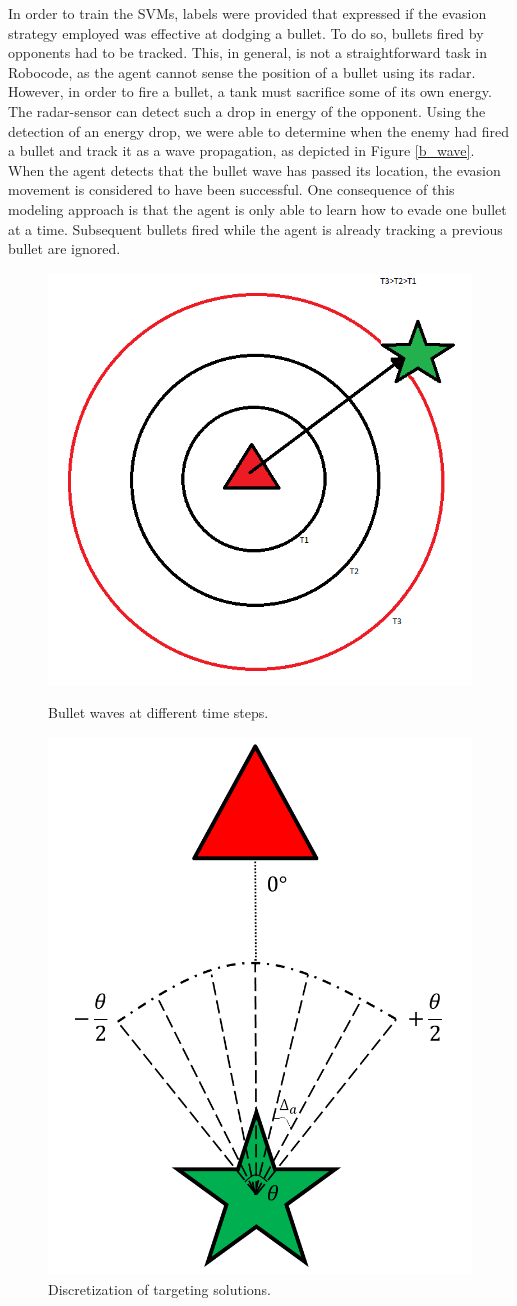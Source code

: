 \documentclass{article}
\theoremstyle{plain}
\theoremstyle{definition}
\theoremstyle{remark}
\begin{document}
In order to train the SVMs, labels were provided that expressed if the evasion strategy employed was effective at dodging a bullet. To do so, bullets fired by opponents had to be tracked. This, in general, is not a straightforward task in Robocode, as the agent cannot sense the position of a bullet using its radar. However, in order to fire a bullet, a tank must sacrifice some of its own energy. The radar-sensor can detect such a drop in energy of the opponent. Using the detection of an energy drop, we were able to determine when the enemy had fired a bullet and track it as a wave propagation, as depicted in Figure \ref{b_wave}. When the agent detects that the bullet wave has passed its location, the evasion movement is considered to have been successful. One consequence of this modeling approach is that the agent is only able to learn how to evade one bullet at a time. Subsequent bullets fired while the agent is already tracking a previous bullet are ignored.

\begin{figure}[t]
\begin{minipage}[b]{0.5\linewidth}
	\centering
		\includegraphics[width=5 cm]{bullet_wave.png}
	\caption{Bullet waves at different time steps.}
	\label{b_wave}
\end{minipage}
\hspace{0.5cm}
\begin{minipage}[b]{0.5\linewidth}
\centering
		\includegraphics[width=5 cm]{targeting.png}
	\caption{Discretization of targeting solutions.}
	\label{tget}
\end{minipage}
\end{figure}
\end{document}
